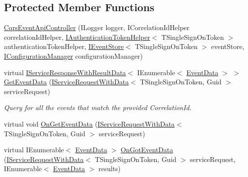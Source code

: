 \subsection*{Protected Member Functions}
\begin{DoxyCompactItemize}
\item 
\hyperlink{classCqrs_1_1WebApi_1_1CqrsEventApiController_a5f1162d692213363fdcaf898f439f7dd_a5f1162d692213363fdcaf898f439f7dd}{Cqrs\+Event\+Api\+Controller} (I\+Logger logger, I\+Correlation\+Id\+Helper correlation\+Id\+Helper, \hyperlink{interfaceCqrs_1_1Authentication_1_1IAuthenticationTokenHelper}{I\+Authentication\+Token\+Helper}$<$ T\+Single\+Sign\+On\+Token $>$ authentication\+Token\+Helper, \hyperlink{interfaceCqrs_1_1Events_1_1IEventStore}{I\+Event\+Store}$<$ T\+Single\+Sign\+On\+Token $>$ event\+Store, \hyperlink{interfaceCqrs_1_1Configuration_1_1IConfigurationManager}{I\+Configuration\+Manager} configuration\+Manager)
\item 
virtual \hyperlink{interfaceCqrs_1_1Services_1_1IServiceResponseWithResultData}{I\+Service\+Response\+With\+Result\+Data}$<$ I\+Enumerable$<$ \hyperlink{classCqrs_1_1Events_1_1EventData}{Event\+Data} $>$ $>$ \hyperlink{classCqrs_1_1WebApi_1_1CqrsEventApiController_aac0079ced115761a0ab605eaebe0801b_aac0079ced115761a0ab605eaebe0801b}{Get\+Event\+Data} (\hyperlink{interfaceCqrs_1_1Services_1_1IServiceRequestWithData}{I\+Service\+Request\+With\+Data}$<$ T\+Single\+Sign\+On\+Token, Guid $>$ service\+Request)
\begin{DoxyCompactList}\small\item\em Query for all the events that match the provided Correlation\+Id. \end{DoxyCompactList}\item 
virtual void \hyperlink{classCqrs_1_1WebApi_1_1CqrsEventApiController_a705b40b973640de14f7b8b7b4c6eb1fe_a705b40b973640de14f7b8b7b4c6eb1fe}{On\+Get\+Event\+Data} (\hyperlink{interfaceCqrs_1_1Services_1_1IServiceRequestWithData}{I\+Service\+Request\+With\+Data}$<$ T\+Single\+Sign\+On\+Token, Guid $>$ service\+Request)
\item 
virtual I\+Enumerable$<$ \hyperlink{classCqrs_1_1Events_1_1EventData}{Event\+Data} $>$ \hyperlink{classCqrs_1_1WebApi_1_1CqrsEventApiController_a9f0147c846a7fd7628d199ff268d178e_a9f0147c846a7fd7628d199ff268d178e}{On\+Got\+Event\+Data} (\hyperlink{interfaceCqrs_1_1Services_1_1IServiceRequestWithData}{I\+Service\+Request\+With\+Data}$<$ T\+Single\+Sign\+On\+Token, Guid $>$ service\+Request, I\+Enumerable$<$ \hyperlink{classCqrs_1_1Events_1_1EventData}{Event\+Data} $>$ results)
\end{DoxyCompactItemize}
